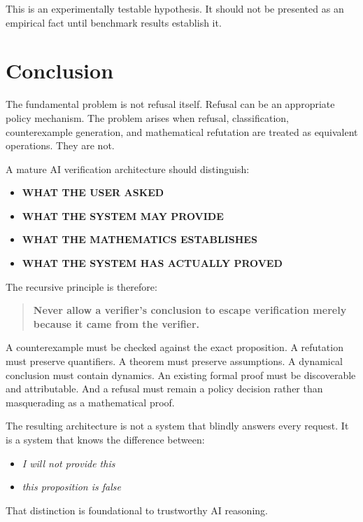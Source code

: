 \documentclass[11pt,a4paper]{article}
\begin{document}
This is an experimentally testable hypothesis. It should not be presented as an empirical fact until benchmark results establish it.

\section{Conclusion}

The fundamental problem is not refusal itself. Refusal can be an appropriate policy mechanism. The problem arises when refusal, classification, counterexample generation, and mathematical refutation are treated as equivalent operations. They are not.

A mature AI verification architecture should distinguish:
\begin{itemize}
\item \textbf{WHAT THE USER ASKED}
\item \textbf{WHAT THE SYSTEM MAY PROVIDE}
\item \textbf{WHAT THE MATHEMATICS ESTABLISHES}
\item \textbf{WHAT THE SYSTEM HAS ACTUALLY PROVED}
\end{itemize}

The recursive principle is therefore:

\begin{quote}
\textbf{Never allow a verifier's conclusion to escape verification merely because it came from the verifier.}
\end{quote}

A counterexample must be checked against the exact proposition. A refutation must preserve quantifiers. A theorem must preserve assumptions. A dynamical conclusion must contain dynamics. An existing formal proof must be discoverable and attributable. And a refusal must remain a policy decision rather than masquerading as a mathematical proof.

The resulting architecture is not a system that blindly answers every request. It is a system that knows the difference between:
\begin{itemize}
\item \textit{I will not provide this}
\item \textit{this proposition is false}
\end{itemize}

That distinction is foundational to trustworthy AI reasoning.
\end{document}
